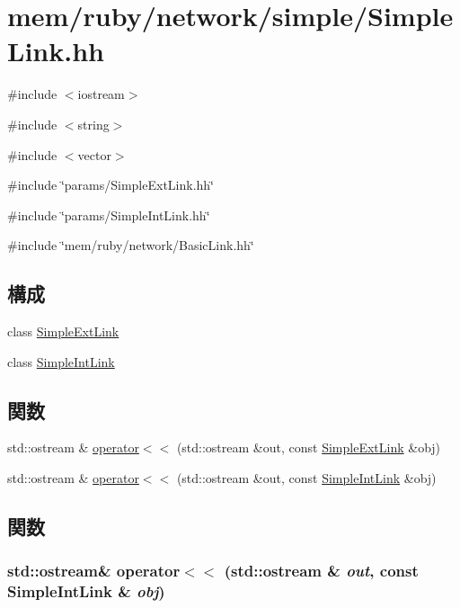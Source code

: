 \hypertarget{SimpleLink_8hh}{
\section{mem/ruby/network/simple/SimpleLink.hh}
\label{SimpleLink_8hh}
}
{\ttfamily \#include $<$iostream$>$}\par
{\ttfamily \#include $<$string$>$}\par
{\ttfamily \#include $<$vector$>$}\par
{\ttfamily \#include \char`\"{}params/SimpleExtLink.hh\char`\"{}}\par
{\ttfamily \#include \char`\"{}params/SimpleIntLink.hh\char`\"{}}\par
{\ttfamily \#include \char`\"{}mem/ruby/network/BasicLink.hh\char`\"{}}\par
\subsection*{構成}
\begin{DoxyCompactItemize}
\item 
class \hyperlink{classSimpleExtLink}{SimpleExtLink}
\item 
class \hyperlink{classSimpleIntLink}{SimpleIntLink}
\end{DoxyCompactItemize}
\subsection*{関数}
\begin{DoxyCompactItemize}
\item 
std::ostream \& \hyperlink{SimpleLink_8hh_a24b2778c8eb71990d0e08b365a4f9897}{operator$<$$<$} (std::ostream \&out, const \hyperlink{classSimpleExtLink}{SimpleExtLink} \&obj)
\item 
std::ostream \& \hyperlink{SimpleLink_8hh_a5fa617230fe59e202bd55426173a79d1}{operator$<$$<$} (std::ostream \&out, const \hyperlink{classSimpleIntLink}{SimpleIntLink} \&obj)
\end{DoxyCompactItemize}


\subsection{関数}
\hypertarget{SimpleLink_8hh_a5fa617230fe59e202bd55426173a79d1}{
\subsubsection[{operator$<$$<$}]{\setlength{\rightskip}{0pt plus 5cm}std::ostream\& operator$<$$<$ (std::ostream \& {\em out}, \/  const {\bf SimpleIntLink} \& {\em obj})}}
\label{SimpleLink_8hh_a5fa617230fe59e202bd55426173a79d1}



